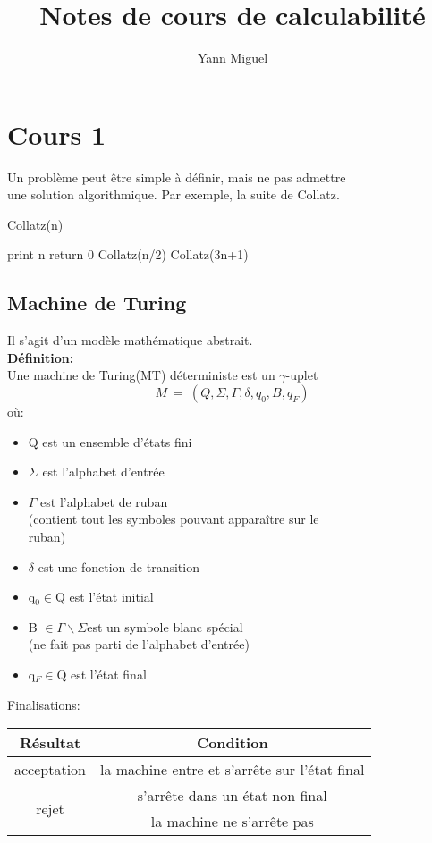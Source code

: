 \documentclass[12pt, a4paper, draft]{article}
\title{Notes de cours de calculabilité}
\author{Yann Miguel}
\begin{document}
\ttfamily
\maketitle
\tableofcontents
\newpage

\section{Cours 1}
Un problème peut être simple à définir, mais ne pas admettre\\une solution algorithmique.
Par exemple, la suite de Collatz.

\begin{algorithm}
  \caption{Collatz(n)}
  \begin{algorithmic}
    \STATE print n
      \STATE return 0
    \ELSE
        \STATE Collatz(n/2)
      \ELSE
        \STATE Collatz(3n+1)
      \ENDIF
    \ENDIF
  \end{algorithmic}
\end{algorithm}

\subsection{Machine de Turing}
Il s'agit d'un modèle mathématique abstrait.\\
\textbf{Définition:}\\
Une machine de Turing(MT) déterministe est un $\gamma$-uplet
$$M~=~(Q,\Sigma,\Gamma,\delta,q_0,B,q_F)$$
où:
\begin{itemize}
  \item Q est un ensemble d'états fini
  \item $\Sigma$ est l'alphabet d'entrée
  \item $\Gamma$ est l'alphabet de ruban\\(contient tout les
  symboles pouvant apparaître sur le\\ruban)
  \item $\delta$ est une fonction de transition
  \item q$_0\in$Q est l'état initial
  \item B $\in\Gamma\backslash\Sigma$est un symbole blanc spécial\\(ne fait pas
  parti de l'alphabet d'entrée)
  \item q$_F\in$Q est l'état final
\end{itemize}

Finalisations:\\
\begin{tabular}{|c|c|}
  \hline
  Résultat & Condition\\
  \hline
  acceptation & la machine entre et s'arrête sur l'état final\\
  \hline
  \multirow{2}{4em}{rejet} & s'arrête dans un état non final\\
  & la machine ne s'arrête pas\\
  \hline
\end{tabular}
\end{document}
